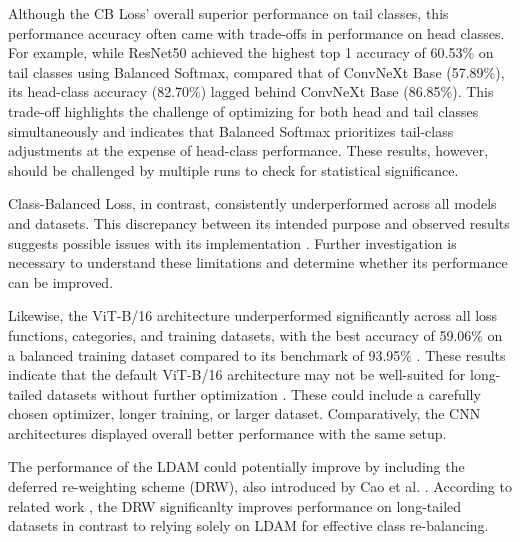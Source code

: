 Although the CB Loss' overall superior performance on tail classes, this performance accuracy often came with trade-offs in performance on head classes. For example, while ResNet50 achieved the highest top 1 accuracy of 60.53\% on tail classes using Balanced Softmax, compared that of ConvNeXt Base (57.89\%), its head-class accuracy (82.70\%) lagged behind ConvNeXt Base (86.85\%). This trade-off highlights the challenge of optimizing for both head and tail classes simultaneously and indicates that Balanced Softmax prioritizes tail-class adjustments at the expense of head-class performance. These results, however, should be challenged by multiple runs to check for statistical significance.

Class-Balanced Loss, in contrast, consistently underperformed across all models and datasets. This discrepancy between its intended purpose and observed results suggests possible issues with its implementation . Further investigation is necessary to understand these limitations and determine whether its performance can be improved. 

Likewise, the ViT-B/16 architecture underperformed significantly across all loss functions, categories, and training datasets, with the best accuracy of 59.06\% on a balanced training dataset compared to its benchmark of 93.95\% . These results indicate that the default ViT-B/16 architecture may not be well-suited for long-tailed datasets without further optimization \cite{menon2021longtaillearninglogitadjustment,loshchilov2018fixing}. These could include a carefully chosen optimizer, longer training, or larger dataset. Comparatively, the CNN architectures displayed overall better performance with the same setup. 



The performance of the LDAM could potentially improve by including the deferred re-weighting scheme (DRW), also introduced by Cao et al. \cite{cao2019learningimbalanceddatasetslabeldistributionaware}. According to related work \cite{menon2021longtaillearninglogitadjustment}, the DRW significanlty improves performance on long-tailed datasets in contrast to relying solely on LDAM for effective class re-balancing. 

